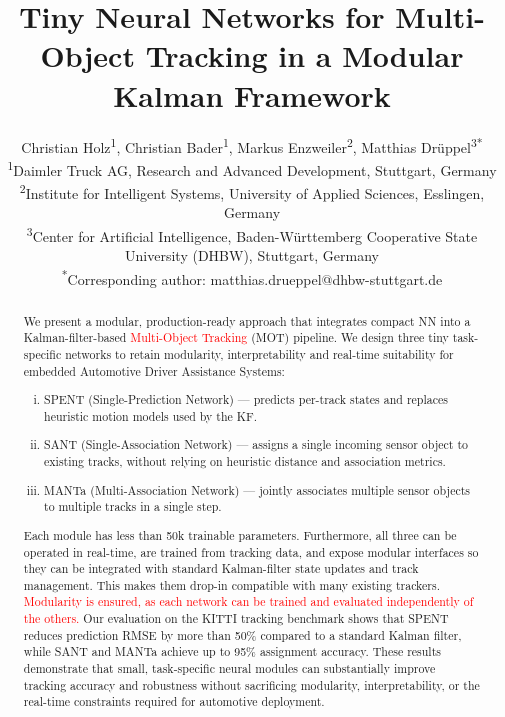 \documentclass[letterpaper, 10 pt, journal, twoside]{IEEEtran}
\newcommand{\red}[1]{\textcolor{red}{#1}}
\begin{document}
\title{Tiny Neural Networks for Multi-Object Tracking in a Modular Kalman Framework}

\author{Christian Holz\textsuperscript{1}, Christian Bader\textsuperscript{1}, Markus Enzweiler\textsuperscript{2}, Matthias Drüppel\textsuperscript{3*}

\begin{small}
\textsuperscript{1}Daimler Truck AG, Research and Advanced Development, Stuttgart, Germany \\
\textsuperscript{2}Institute for Intelligent Systems, University of Applied Sciences, Esslingen, Germany \\
\textsuperscript{3}Center for Artificial Intelligence, Baden-Württemberg Cooperative State University (DHBW), Stuttgart, Germany \\
\textsuperscript{*}Corresponding author: matthias.drueppel@dhbw-stuttgart.de
\end{small}

}

\maketitle

\begin{abstract}

We present a modular, production-ready approach that integrates compact \ac{NN} into a Kalman-filter-based \red{Multi-Object Tracking} (MOT) pipeline. We design three tiny task-specific networks to retain modularity, interpretability and real-time suitability for embedded Automotive Driver Assistance Systems:
\begin{enumerate}[(i)]
\item SPENT (Single-Prediction Network) — predicts per-track states and replaces heuristic motion models used by the \ac{KF}.
\item  SANT (Single-Association Network) — assigns a single incoming sensor object to existing tracks, without relying on heuristic distance and association metrics.
\item MANTa (Multi-Association Network) — jointly associates multiple sensor objects to multiple tracks in a single step.
\end{enumerate}
Each module has less than 50k trainable parameters. Furthermore, all three can be operated in real-time, are trained from tracking data, and expose modular interfaces so they can be integrated with standard Kalman-filter state updates and track management. This makes them drop-in compatible with many existing trackers. \red{Modularity is ensured, as each network can be trained and evaluated independently of the others.} Our evaluation on the KITTI tracking benchmark shows that SPENT reduces prediction RMSE by more than 50\% compared to a standard Kalman filter, while SANT and MANTa achieve up to 95\% assignment accuracy. These results demonstrate that small, task-specific neural modules can substantially improve tracking accuracy and robustness without sacrificing modularity, interpretability, or the real-time constraints required for automotive deployment.
\end{abstract}
\end{document}
